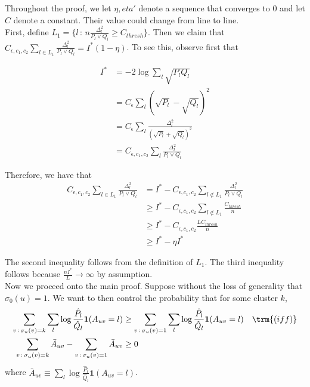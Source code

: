 \documentclass{article}
\begin{document}
Throughout the proof, we let $\eta, eta'$ denote a sequence that converges to 0 and let $C$ denote a constant. Their value could change from line to line. \\

First, define $L_1 = \{ l \,:\, n \frac{\Delta_l^2}{P_l \vee Q_l} \geq C_{thresh} \}$. Then we claim that $C_{\epsilon, c_1, c_2} \sum_{l \in L_1} \frac{\Delta_l^2}{P_l \vee Q_l} = I^*( 1 - \eta )$. To see this, observe first that

\begin{align*}
I^* &= -2 \log \sum_l \sqrt{P_l Q_l} \\
  &= C_\epsilon \sum_l (\sqrt{P_l} - \sqrt{Q_l} )^2 \\
  &= C_\epsilon \sum_l \frac{\Delta_l^2}{(\sqrt{P_l} + \sqrt{Q_l})^2} \\
  &= C_{\epsilon, c_1, c_2} \sum_l \frac{\Delta_l^2}{P_l \vee Q_l} 
\end{align*}

Therefore, we have that
\begin{align*}
C_{\epsilon, c_1, c_2} \sum_{l \in L_1} \frac{\Delta_l^2}{P_l \vee Q_l} &= I^* - 
 C_{\epsilon, c_1, c_2} \sum_{l \notin L_1} \frac{\Delta_l^2}{P_l \vee Q_l} \\
 &\geq I^* - C_{\epsilon, c_1, c_2} \sum_{l \notin L_1} \frac{C_{thresh}}{n} \\
 &\geq I^* - C_{\epsilon, c_1, c_2} \frac{ L C_{thresh}}{n} \\
 &\geq I^* - \eta I^* 
\end{align*}

The second inequality follows from the definition of $L_1$. The third inequality follows because $\frac{n I^*}{L} \rightarrow \infty$ by assumption. \\


Now we proceed onto the main proof. Suppose without the loss of generality that $\sigma_0(u) = 1$.  We want to then control the probability that for some cluster $k$, 
\begin{align}
\sum_{v\,:\, \sigma_u(v)=k} \sum_l \log \frac{\hat{P}_l}{\hat{Q}_l} \mathbf{1}(A_{uv} = l) 
&\geq 
 \sum_{v\,:\, \sigma_u(v)=1} \sum_l \log \frac{\hat{P}_l}{\hat{Q}_l} \mathbf{1}(A_{uv} = l) 
  \quad \trm{(iff)}  \nonumber \\
\sum_{v \,:\, \sigma_u(v) = k} \bar{A}_{uv} - \sum_{v\,:\, \sigma_u(v) = 1} \bar{A}_{uv} 
\label{eqn:bad_event1}
&\geq 0 
\end{align}
where $\bar{A}_{uv} \equiv \sum_l \log \frac{\hat{P}_l}{\hat{Q}_l} \mathbf{1}(A_{uv} = l)$.
\end{document}
